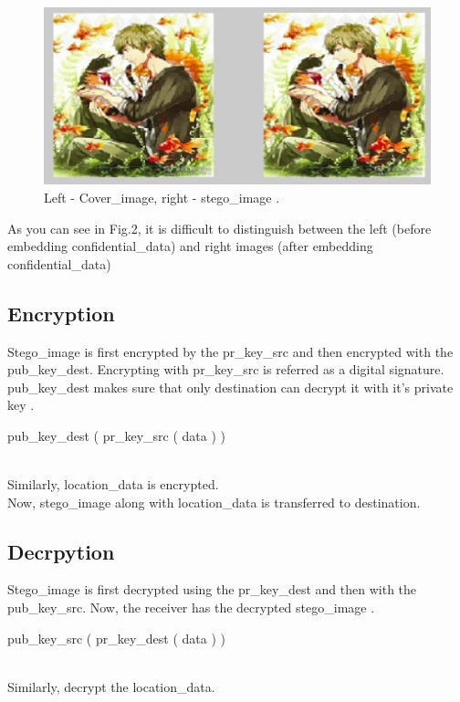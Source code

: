 \documentclass[conference]{IEEEtran}
\begin{document}
\begin{figure}[H]
  \includegraphics[width=\linewidth]{cover_image_vs_stego_image.png}
  \caption{Left - Cover\_image, right - stego\_image \cite{b2}.}
\end{figure}

As you can see in Fig.2, it is difficult to distinguish between the left (before embedding confidential\_data) and right images (after embedding confidential\_data)

\subsection{Encryption}
Stego\_image is first encrypted by the pr\_key\_src and then encrypted with the pub\_key\_dest.
Encrypting with pr\_key\_src is referred as a digital signature.
pub\_key\_dest makes sure that only destination can decrypt it with it's private key \cite{b2}.\\

\centerline{ pub\_key\_dest ( pr\_key\_src ( data ) ) }
\leavevmode \\
Similarly, location\_data is encrypted.\\

Now, stego\_image along with location\_data is transferred to destination.

\subsection{Decrpytion}
Stego\_image is first decrypted using the pr\_key\_dest and then with the pub\_key\_src.
Now, the receiver has the decrypted stego\_image .\\

\centerline{ pub\_key\_src ( pr\_key\_dest ( data ) ) }
\leavevmode \\

Similarly, decrypt the location\_data. \\
\end{document}

